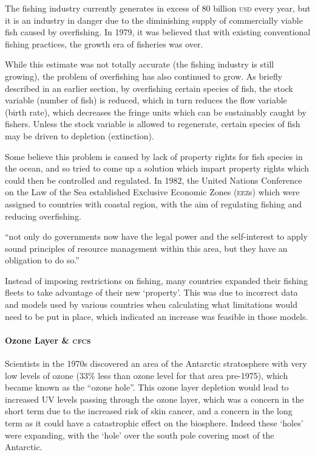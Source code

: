 \documentclass[]{article} %
\begin{document}
The fishing industry currently generates in excess of 80 billion \textsc{usd} every year, but it is an industry in danger due to the diminishing supply of commercially viable fish caused by overfishing. In 1979, it was believed that with existing conventional fishing practices, the growth era of fisheries was over.

While this estimate was not totally accurate (the fishing industry is still growing), the problem of overfishing has also continued to grow. As briefly described in an earlier section, by overfishing certain species of fish, the stock variable (number of fish) is reduced, which in turn reduces the flow variable (birth rate), which decreases the fringe units which can be sustainably caught by fishers. Unless the stock variable is allowed to regenerate, certain species of fish may be driven to depletion (extinction).

Some believe this problem is caused by lack of property rights for fish species in the ocean, and so tried to come up a solution which impart property rights which could then be controlled and regulated. In 1982, the United Nations Conference on the Law of the Sea established Exclusive Economic Zones (\textsc{eez}s) which were assigned to countries with coastal region, with the aim of regulating fishing and reducing overfishing.~\cite{Canada-sea-law}

“not only do governments now have the legal power and the self-interest to apply sound principles of resource management within this area, but they have an obligation to do so.”

Instead of imposing restrictions on fishing, many countries expanded their fishing fleets to take advantage of their new ‘property’. This was due to incorrect data and models used by various countries when calculating what limitations would need to be put in place, which indicated an increase was feasible in those models.

\paragraph{Ozone Layer \& \textsc{cfc}s}

Scientists in the 1970s discovered an area of the Antarctic stratosphere with very low levels of ozone (33\% less than ozone level for that area pre-1975), which became known as the “ozone hole”. This ozone layer depletion would lead to increased UV levels passing through the ozone layer, which was a concern in the short term due to the increased risk of skin cancer, and a concern in the long term as it could have a catastrophic effect on the biosphere. Indeed these ‘holes’ were expanding, with the ‘hole’ over the south pole covering most of the Antarctic.
\end{document}
